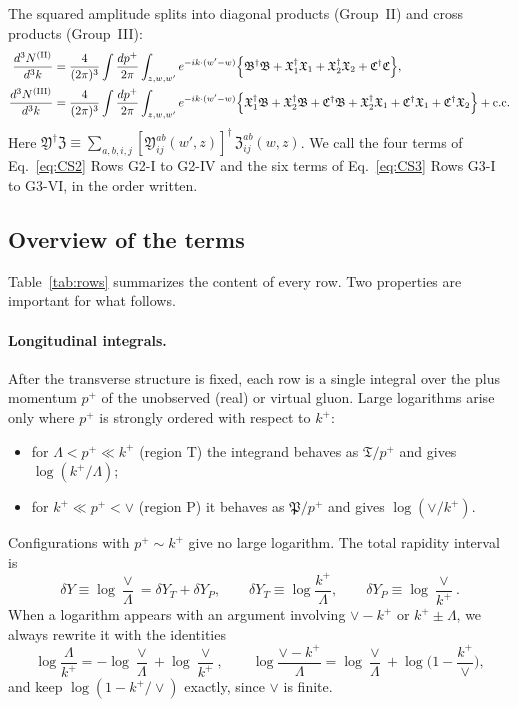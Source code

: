 \documentclass[aps,prd,onecolumn,superscriptaddress,nofootinbib,floatfix,longbibliography,11pt]{revtex4-2}
\numberwithin{equation}{section}
\begin{document}
The squared amplitude splits into diagonal products (Group~II) and cross products (Group~III):
\begin{align}
\frac{d^3N^{\rm (II)}}{d^3k}={}&\frac{4}{(2\pi)^3}\int\frac{dp^+}{2\pi}\int_{z,w,w'}e^{-ik\cdot(w'-w)}\Big\{\mathfrak B^\dagger\mathfrak B+\mathfrak X_1^\dagger\mathfrak X_1+\mathfrak X_2^\dagger\mathfrak X_2+\mathfrak C^\dagger\mathfrak C\Big\},\label{eq:CS2}\\
\frac{d^3N^{\rm (III)}}{d^3k}={}&\frac{4}{(2\pi)^3}\int\frac{dp^+}{2\pi}\int_{z,w,w'}e^{-ik\cdot(w'-w)}\Big\{\mathfrak X_1^\dagger\mathfrak B+\mathfrak X_2^\dagger\mathfrak B+\mathfrak C^\dagger\mathfrak B+\mathfrak X_2^\dagger\mathfrak X_1+\mathfrak C^\dagger\mathfrak X_1+\mathfrak C^\dagger\mathfrak X_2\Big\}+{\rm c.c.}\label{eq:CS3}
\end{align}
Here $\mathfrak Y^\dagger\mathfrak Z\equiv\sum_{a,b,i,j}[\mathfrak Y^{ab}_{ij}(w',z)]^\dagger\,\mathfrak Z^{ab}_{ij}(w,z)$. We call the four terms of Eq.~\eqref{eq:CS2} Rows G2-I to G2-IV and the six terms of Eq.~\eqref{eq:CS3} Rows G3-I to G3-VI, in the order written.

\subsection{Overview of the terms}\label{sec:rows}

Table~\ref{tab:rows} summarizes the content of every row. Two properties are important for what follows.

\paragraph*{Longitudinal integrals.} After the transverse structure is fixed, each row is a single integral over the plus momentum $p^+$ of the unobserved (real) or virtual gluon. Large logarithms arise only where $p^+$ is strongly ordered with respect to $k^+$:
\begin{itemize}
\item for $\Lambda<p^+\ll k^+$ (region T) the integrand behaves as $\mathfrak T/p^+$ and gives $\log(k^+/\Lambda)$;
\item for $k^+\ll p^+<\vee$ (region P) it behaves as $\mathfrak P/p^+$ and gives $\log(\vee/k^+)$.
\end{itemize}
Configurations with $p^+\sim k^+$ give no large logarithm. The total rapidity interval is
\begin{equation}
\delta Y\equiv\log\frac{\vee}{\Lambda}=\delta Y_T+\delta Y_P,\qquad \delta Y_T\equiv\log\frac{k^+}{\Lambda},\qquad \delta Y_P\equiv\log\frac{\vee}{k^+}.
\label{eq:dYdef}
\end{equation}
When a logarithm appears with an argument involving $\vee-k^+$ or $k^+\pm\Lambda$, we always rewrite it with the identities
\begin{equation}
\log\frac{\Lambda}{k^+}=-\log\frac{\vee}{\Lambda}+\log\frac{\vee}{k^+},\qquad \log\frac{\vee-k^+}{\Lambda}=\log\frac{\vee}{\Lambda}+\log\Big(1-\frac{k^+}{\vee}\Big),
\label{eq:logid}
\end{equation}
and keep $\log(1-k^+/\vee)$ exactly, since $\vee$ is finite.
\end{document}
